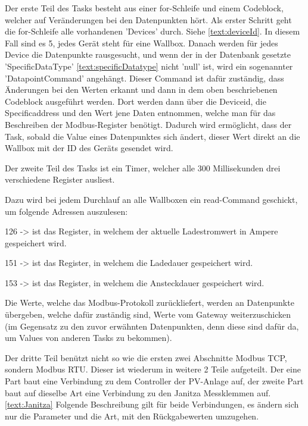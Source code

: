 Der erste Teil des Tasks besteht aus einer for-Schleife und einem Codeblock, welcher auf Veränderungen bei den Datenpunkten hört. Als erster Schritt geht die for-Schleife alle vorhandenen 'Devices' durch. Siehe \ref{text:deviceId}. In diesem Fall sind es 5, jedes Gerät steht für eine Wallbox. Danach werden für jedes Device die Datenpunkte rausgesucht, und wenn der in der Datenbank gesetzte 'SpecificDataType' \ref{text:specificDatatype} nicht 'null' ist, wird ein sogenannter 'DatapointCommand' angehängt. Dieser Command ist dafür zuständig, dass Änderungen bei den Werten erkannt und dann in dem oben beschriebenen Codeblock ausgeführt werden. Dort werden dann über die Deviceid, die Specificaddress und den Wert jene Daten entnommen, welche man für das Beschreiben der Modbus-Register benötigt. Dadurch wird ermöglicht, dass der Task, sobald die Value eines Datenpunktes sich ändert, dieser Wert direkt an die Wallbox mit der ID des Geräts gesendet wird.

Der zweite Teil des Tasks ist ein Timer, welcher alle 300 Millisekunden drei verschiedene Register ausliest.

Dazu wird bei jedem Durchlauf an alle Wallboxen ein read-Command geschickt, um folgende Adressen auszulesen:

\begin{compactitem}
  \item 126 -> ist das Register, in welchem der aktuelle Ladestromwert in Ampere gespeichert wird.
  \item 151 -> ist das Register, in welchem die Ladedauer gespeichert wird.
  \item 153 -> ist das Register, in welchem die Ansteckdauer gespeichert wird.
\end{compactitem}



Die Werte, welche das Modbus-Protokoll zurückliefert, werden an Datenpunkte übergeben, welche dafür zuständig sind, Werte vom Gateway weiterzuschicken (im Gegensatz zu den zuvor erwähnten Datenpunkten, denn diese sind dafür da, um Values von anderen Tasks zu bekommen).

Der dritte Teil benützt nicht so wie die ersten zwei Abschnitte Modbus TCP, sondern Modbus RTU. Dieser ist wiederum in weitere 2 Teile aufgeteilt. Der eine Part baut eine Verbindung zu dem Controller der PV-Anlage auf, der zweite Part baut auf dieselbe Art eine Verbindung zu den Janitza Messklemmen auf. \ref{text:Janitza} Folgende Beschreibung gilt für beide Verbindungen, es ändern sich nur die Parameter und die Art, mit den Rückgabewerten umzugehen.

